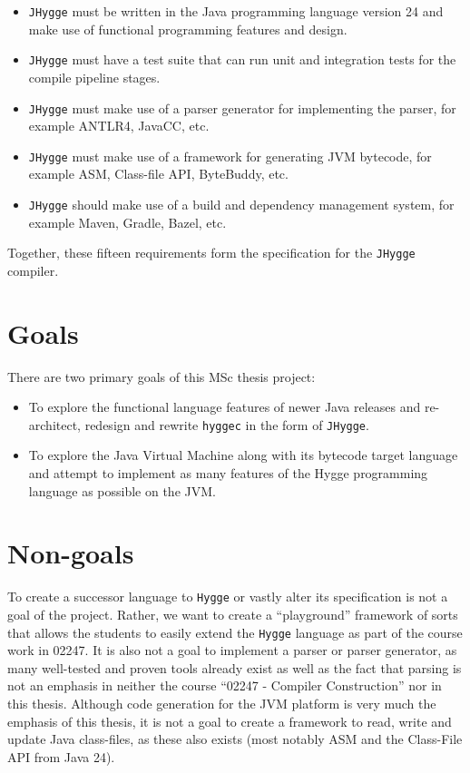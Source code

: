 \begin{itemize}
  \item \texttt{JHygge} must be written in the Java programming language version 24 and make use of functional programming features and design.
  \item \texttt{JHygge} must have a test suite that can run unit and integration tests for the compile pipeline stages.
  \item \texttt{JHygge} must make use of a parser generator for implementing the parser, for example ANTLR4, JavaCC, etc.
  \item \texttt{JHygge} must make use of a framework for generating JVM bytecode, for example ASM, Class-file API, ByteBuddy, etc.
  \item \texttt{JHygge} should make use of a build and dependency management system, for example Maven, Gradle, Bazel, etc.
\end{itemize}

Together, these fifteen requirements form the specification for the \texttt{JHygge} compiler.

\section{Goals}

There are two primary goals of this MSc thesis project:

\begin{itemize}
  \item To explore the functional language features of newer Java releases and re-architect, redesign and rewrite \texttt{hyggec} in the form of \texttt{JHygge}.
  \item To explore the Java Virtual Machine along with its bytecode target language and attempt to implement as many features of the Hygge programming language as possible on the JVM.
\end{itemize}

\section{Non-goals}

To create a successor language to \texttt{Hygge} or vastly alter its specification is not a goal of the project. Rather, we want to create a
``playground'' framework of sorts that allows the students to easily extend the \texttt{Hygge} language as part of the course work in 02247. 
It is also not a goal to implement a parser or parser generator, as many well-tested and proven tools already exist as well as the fact that
parsing is not an emphasis in neither the course ``02247 - Compiler Construction'' nor in this thesis. Although code generation for the JVM platform
is very much the emphasis of this thesis, it is not a goal to create a framework to read, write and update Java class-files, as these also exists 
(most notably ASM and the Class-File API from Java 24).
